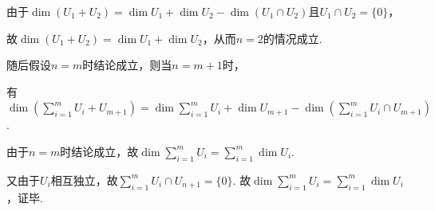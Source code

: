 由于\(\dim (U_1+U_2)=\dim U_1+\dim U_2-\dim (U_1\cap U_2)\)且\(U_1\cap U_2=\{0\}\)，

故\(\dim (U_1+U_2)=\dim U_1+\dim U_2\)，从而\(n=2\)的情况成立.

随后假设\(n=m\)时结论成立，则当\(n=m+1\)时，

有\(\dim (\sum_{i=1}^m U_i+U_{m+1})=\dim \sum_{i=1}^m U_i+\dim U_{m+1}-\dim (\sum_{i=1}^m U_i \cap U_{m+1})\).

由于\(n=m\)时结论成立，故\(\dim \sum_{i=1}^m U_i=\sum_{i=1}^m \dim U_i\).

又由于\(U_i\)相互独立，故\(\sum_{i=1}^m U_i \cap U_{n+1}=\{0\}\).
故\(\dim \sum_{i=1}^m U_i=\sum_{i=1}^m \dim U_i\)，证毕.

